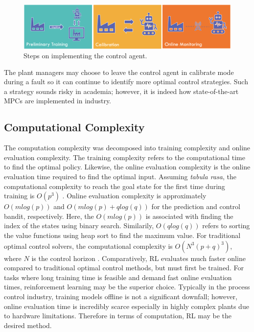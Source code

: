 \begin{figure}[H]
    \centering
    \includegraphics[width=12cm]{images/ftc/rl_implementation.png}
    \caption{Steps on implementing the control agent.}
    \label{fig:08RL_implementation}
\end{figure}

The plant managers may choose to leave the control agent in calibrate mode during a fault so it can continue to identify more optimal control strategies.  Such a strategy sounds risky in academia; however, it is indeed how state-of-the-art MPCs are implemented in industry.

\subsection{Computational Complexity}
The computation complexity was decomposed into training complexity and online evaluation complexity.  The training complexity refers to the computational time to find the optimal policy.  Likewise, the online evaluation complexity is the online evaluation time required to find the optimal input.  Assuming \textit{tabula rasa}, the computational complexity to reach the goal state for the first time during training is $O(p^3)$ \cite{complexity_rl_ref19}. Online evaluation complexity is approximately $O(mlog(p))$ and $O(mlog(p) + qlog(q))$ for the prediction and control bandit, respectively. Here, the $O(mlog(p))$ is associated with finding the index of the states using binary search.  Similarily, $O(qlog(q))$ refers to sorting the value functions using heap sort to find the maximum value. For traditional optimal control solvers, the computational complexity is $O(N^3(p + q)^3)$, where $N$ is the control horizon \cite{mpc_comp_time}. Comparatively, RL evaluates much faster online compared to traditional optimal control methods, but must first be trained. For tasks where long training time is feasible and demand fast online evaluation times, reinforcement learning may be the superior choice.  Typically in the process control industry, training models offline is not a significant downfall; however, online evaluation time is incredibly scarce especially in highly complex plants due to hardware limitations.  Therefore in terms of computation, RL may be the desired method.

